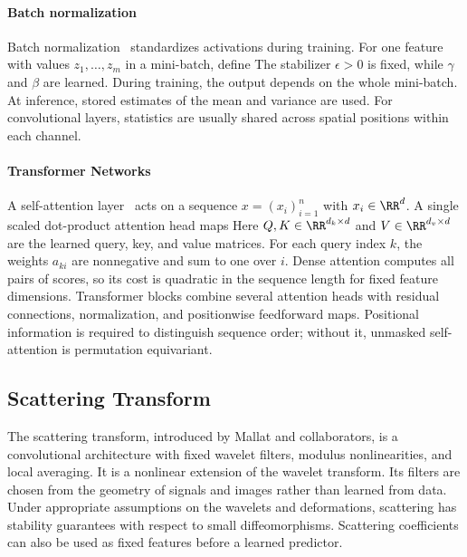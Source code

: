 \paragraph{Batch normalization}

Batch normalization~\cite{ioffe2015batch} standardizes activations during training. For one feature with values $z_1,\ldots,z_m$ in a mini-batch, define
The stabilizer $\epsilon>0$ is fixed, while $\gamma$ and $\beta$ are learned. During training, the output depends on the whole mini-batch. At inference, stored estimates of the mean and variance are used. For convolutional layers, statistics are usually shared across spatial positions within each channel.

\paragraph{Transformer Networks}
A self-attention layer~\cite{vaswani2017attention} acts on a sequence $x=(x_i)_{i=1}^n$ with $x_i\in\RR^d$. A single scaled dot-product attention head maps
Here $Q,K\in\RR^{d_k\times d}$ and $V\in\RR^{d_v\times d}$ are the learned query, key, and value matrices. For each query index $k$, the weights $a_{ki}$ are nonnegative and sum to one over $i$. Dense attention computes all pairs of scores, so its cost is quadratic in the sequence length for fixed feature dimensions. Transformer blocks combine several attention heads with residual connections, normalization, and positionwise feedforward maps. Positional information is required to distinguish sequence order; without it, unmasked self-attention is permutation equivariant.

\subsection{Scattering Transform}
\label{sec-scattering}

The scattering transform, introduced by Mallat and collaborators, is a convolutional architecture with fixed wavelet filters, modulus nonlinearities, and local averaging. It is a nonlinear extension of the wavelet transform. Its filters are chosen from the geometry of signals and images rather than learned from data. Under appropriate assumptions on the wavelets and deformations, scattering has stability guarantees with respect to small diffeomorphisms. Scattering coefficients can also be used as fixed features before a learned predictor.

